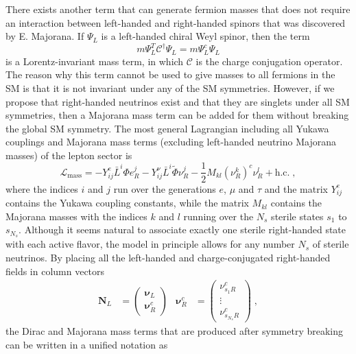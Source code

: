 There exists another term that can generate fermion masses that does not require an interaction between left-handed and right-handed spinors that was discovered by E.
Majorana.
If $\Psi_L$ is a left-handed chiral Weyl spinor, then the term
\begin{equation}
   m \Psi_L^T \mathcal{C}^\dag \Psi_L = m \Psi_L^c \Psi_L
\end{equation}
is a Lorentz-invariant mass term, in which $\mathcal{C}$ is the charge conjugation operator.
The reason why this term cannot be used to give masses to all fermions in the SM is that it is not invariant under any of the SM symmetries.
However, if we propose that right-handed neutrinos exist and that they are singlets under all SM symmetries, then a Majorana mass term can be added for them without breaking the global SM symmetry.
The most general Lagrangian including all Yukawa couplings and Majorana mass terms (excluding left-handed neutrino Majorana masses) of the lepton sector is
\begin{equation}
  \mathcal{L}_\mathrm{mass} = -Y_{ij}^e \bar{L}^i \Phi e_R^j - Y_{ij}^\nu \bar{L}^i \tilde{\Phi} \nu_R^j - \frac{1}{2}M_{kl}(\nu_R^k)^c \nu_R^l + \mathrm{h.c.}\;,
\end{equation}
where the indices $i$ and $j$ run over the generations $e$, $\mu$ and $\tau$ and the matrix $Y_{ij}^e$ contains the Yukawa coupling constants, while the matrix $M_{kl}$ contains the Majorana masses with the indices $k$ and $l$ running over the $N_s$ sterile states $s_1$ to $s_{N_s}$.
Although it seems natural to associate exactly one sterile right-handed state with each active flavor, the model in principle allows for any number $N_s$ of sterile neutrinos.
By placing all the left-handed and charge-conjugated right-handed fields in column vectors
\begin{equation}
\begin{aligned}
  \boldsymbol{N}_L &= \begin{pmatrix} \boldsymbol{\nu}_L \\ \boldsymbol{\nu}_R^c \end{pmatrix}
  &\boldsymbol{\nu}_R^c  &= \begin{pmatrix}\nu_{s_{1} R}^c \\ \vdots \\ \nu_{s_{N_{s}} R}^c\end{pmatrix}\;,
\end{aligned}
\end{equation}
the Dirac and Majorana mass terms that are produced after symmetry breaking can be written in a unified notation as
